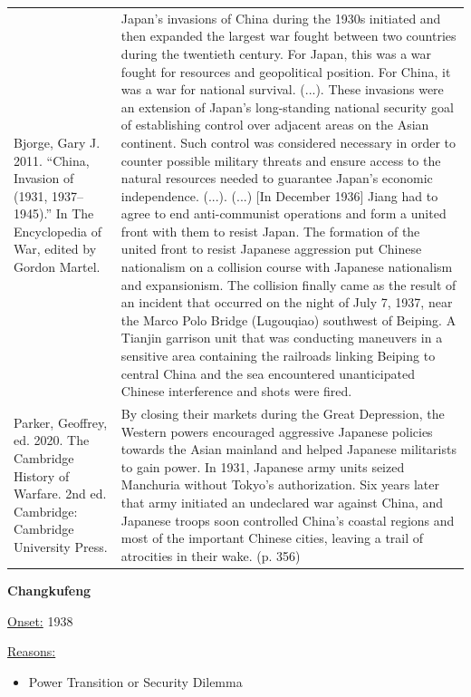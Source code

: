 {\begin{longtable}{p{}p{}}
Bjorge, Gary J. 2011. “China, Invasion of (1931, 1937–1945).” In The Encyclopedia of War, edited by Gordon Martel. & Japan's invasions of China during the 1930s initiated and then expanded the largest war fought between two countries during the twentieth century. For Japan, this was a war fought for resources and geopolitical position. For China, it was a war for national survival. (...). These invasions were an extension of Japan's long-standing national security goal of establishing control over adjacent areas on the Asian continent. Such control was considered necessary in order to counter possible military threats and ensure access to the natural resources needed to guarantee Japan's economic independence. (...).
(...) [In December 1936] Jiang had to agree to end anti-communist operations and form a united front with them to resist Japan. The formation of the united front to resist Japanese aggression put Chinese nationalism on a collision course with Japanese nationalism and expansionism. The collision finally came as the result of an incident that occurred on the night of July 7, 1937, near the Marco Polo Bridge (Lugouqiao) southwest of Beiping. A Tianjin garrison unit that was conducting maneuvers in a sensitive area containing the railroads linking Beiping to central China and the sea encountered unanticipated Chinese interference and shots were fired.
\\
Parker, Geoffrey, ed. 2020. The Cambridge History of Warfare. 2nd ed. Cambridge: Cambridge University Press. & By closing their markets during the Great Depression, the Western powers encouraged aggressive Japanese policies towards the Asian mainland and helped Japanese militarists to gain power. In 1931, Japanese army units seized Manchuria without Tokyo's authorization. Six years later that army initiated an undeclared war against China, and Japanese troops soon controlled China's coastal regions and most of the important Chinese cities, leaving a trail of atrocities in their wake.  (p. 356)
\\
\end{longtable}}
\clearpage
         \textbf{Changkufeng} 

          \underline{Onset:} 1938         

\underline{Reasons:}
\begin{itemize}
\item Power Transition or Security Dilemma
\end{itemize}

